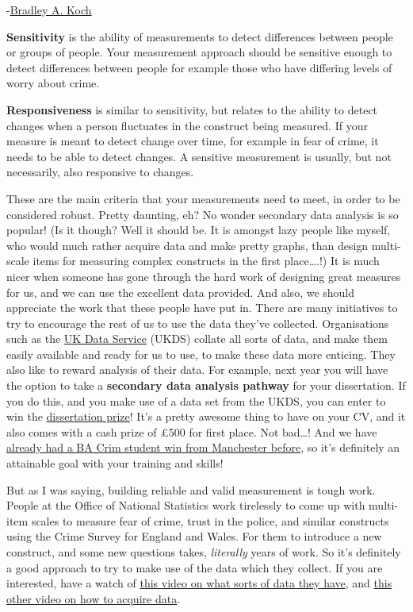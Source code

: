 \documentclass[
]{book}
\begin{document}
-\href{http://www.socingoutloud.com/2012/10/teaching-validity-and-reliability-in.html}{Bradley A. Koch}

\textbf{Sensitivity} is the ability of measurements to detect differences between people or groups of people. Your measurement approach should be sensitive enough to detect differences between people for example those who have differing levels of worry about crime.

\textbf{Responsiveness} is similar to sensitivity, but relates to the ability to detect changes when a person fluctuates in the construct being measured. If your measure is meant to detect change over time, for example in fear of crime, it needs to be able to detect changes. A sensitive measurement is usually, but not necessarily, also responsive to changes.

These are the main criteria that your measurements need to meet, in order to be considered robust. Pretty daunting, eh? No wonder secondary data analysis is so popular! (Is it though? Well it should be. It is amongst lazy people like myself, who would much rather acquire data and make pretty graphs, than design multi-scale items for measuring complex constructs in the first place\ldots.!) It is much nicer when someone has gone through the hard work of designing great measures for us, and we can use the excellent data provided. And also, we should appreciate the work that these people have put in. There are many initiatives to try to encourage the rest of us to use the data they've collected. Organisations such as the \href{https://www.ukdataservice.ac.uk/}{UK Data Service} (UKDS) collate all sorts of data, and make them easily available and ready for us to use, to make these data more enticing. They also like to reward analysis of their data. For example, next year you will have the option to take a \textbf{secondary data analysis pathway} for your dissertation. If you do this, and you make use of a data set from the UKDS, you can enter to win the \href{https://www.ukdataservice.ac.uk/use-data/student-resources/dissertation-prize}{dissertation prize}! It's a pretty awesome thing to have on your CV, and it also comes with a cash prize of £500 for first place. Not bad\ldots! And we have \href{https://www.ukdataservice.ac.uk/news-and-events/newsitem/?id=4650}{already had a BA Crim student win from Manchester before}, so it's definitely an attainable goal with your training and skills!

But as I was saying, building reliable and valid measurement is tough work. People at the Office of National Statistics work tirelessly to come up with multi-item scales to measure fear of crime, trust in the police, and similar constructs using the Crime Survey for England and Wales. For them to introduce a new construct, and some new questions takes, \emph{literally} years of work. So it's definitely a good approach to try to make use of the data which they collect. If you are interested, have a watch of \href{https://www.youtube.com/watch?v=cCpHnqn0Q2c\&list=PLG87Imnep1SljSqc0yLIHYBP1w0saMJn-\&index=2}{this video on what sorts of data they have}, and \href{https://www.youtube.com/watch?list=PLG87Imnep1SljSqc0yLIHYBP1w0saMJn-\&v=TzRWJK1MtrU}{this other video on how to acquire data}.
\end{document}

